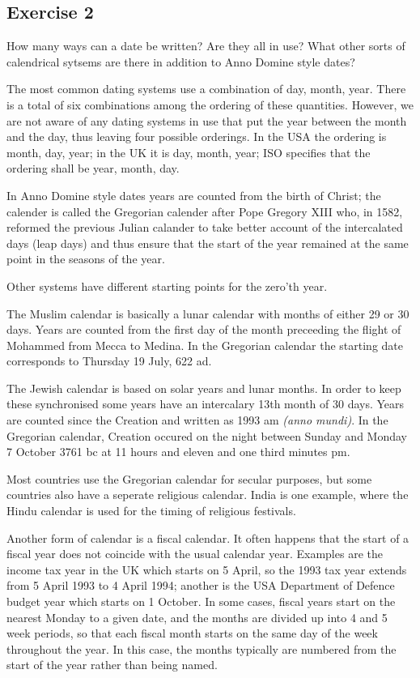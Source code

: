 \documentclass{article}
\begin{document}
\subsection{Exercise 2}

\begin{itshape}
 How many ways can a date be written? Are they all in use?
      What other sorts of calendrical sytsems are there in addition to 
      Anno Domine style dates?
\end{itshape}

    The most common dating systems use a combination of day, month, year. There
is a total of six combinations among the ordering of these quantities. However,
we are not aware of any dating systems in use that put the year between the
month and the day, thus leaving four possible orderings. In the USA the ordering
is month, day, year; in the UK it is day, month, year; ISO specifies that the
ordering shall be year, month, day.

   In Anno Domine style dates years are counted from the birth of Christ; the
calender is called the Gregorian calender after Pope Gregory XIII who, in 1582,
 reformed the
previous Julian calander to take better account of the intercalated days
(leap days) and thus ensure that the start of the year remained at the same
point in the seasons of the year.

   Other systems have different starting points for the zero'th year.

   The Muslim calendar is basically a lunar calendar with months of either
29 or 30 days. Years are counted from the first day of the month preceeding
the flight of Mohammed from Mecca to Medina. In the Gregorian calendar the
starting date corresponds to Thursday 19 July, 622 {\sc ad}.

    The Jewish calendar is based on solar years and lunar months. In order to
keep these synchronised some years have an intercalary 13th month of 30 days.
Years are counted since the Creation and written as 1993 {\sc am} {\em (anno
mundi)}. In the Gregorian calendar, Creation occured on the night between Sunday
and Monday 7 October 3761 {\sc bc} at 11 hours and eleven and one third
minutes {\sc pm}.

    Most countries use the Gregorian calendar for secular purposes, but some 
countries also have a seperate religious calendar. India is one example, where the
Hindu calendar is used for the timing of religious festivals.

   Another form of calendar is a fiscal calendar. It often happens that the start
of a fiscal year does not coincide with the usual calendar year. Examples are
the income tax year in the UK which starts on 5 April, so the 1993 tax year
extends from 5 April 1993 to 4 April 1994; another is the USA Department of 
Defence budget year which starts on 1 October. In some cases, fiscal years
start on the nearest Monday to a given date, and the months are divided up into
4 and 5 week periods, so that each fiscal month starts on the same day of the
week throughout the year. In this case, the months typically are numbered from 
the start of the year rather than being named.
\end{document}
